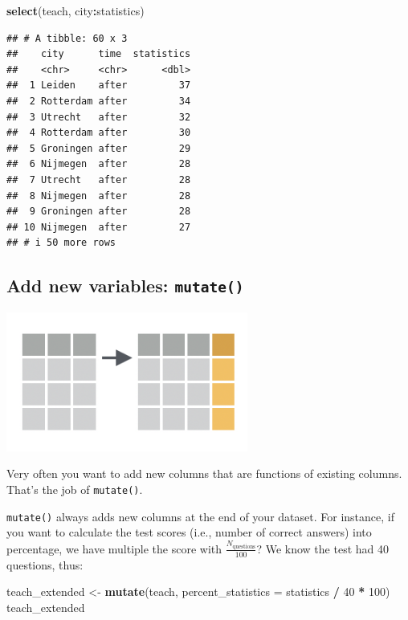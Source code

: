 \documentclass[
]{scrartcl}
\newenvironment{Shaded}{\begin{snugshade}}{\end{snugshade}}
\newcommand{\AttributeTok}[1]{\textcolor[rgb]{0.13,0.29,0.53}{#1}}
\newcommand{\DecValTok}[1]{\textcolor[rgb]{0.00,0.00,0.81}{#1}}
\newcommand{\FunctionTok}[1]{\textcolor[rgb]{0.13,0.29,0.53}{\textbf{#1}}}
\newcommand{\NormalTok}[1]{#1}
\newcommand{\OtherTok}[1]{\textcolor[rgb]{0.56,0.35,0.01}{#1}}
\newcommand{\SpecialCharTok}[1]{\textcolor[rgb]{0.81,0.36,0.00}{\textbf{#1}}}
\begin{document}
\begin{Shaded}
\begin{Highlighting}[]
\FunctionTok{select}\NormalTok{(teach, city}\SpecialCharTok{:}\NormalTok{statistics)}
\end{Highlighting}
\end{Shaded}

\begin{verbatim}
## # A tibble: 60 x 3
##    city      time  statistics
##    <chr>     <chr>      <dbl>
##  1 Leiden    after         37
##  2 Rotterdam after         34
##  3 Utrecht   after         32
##  4 Rotterdam after         30
##  5 Groningen after         29
##  6 Nijmegen  after         28
##  7 Utrecht   after         28
##  8 Nijmegen  after         28
##  9 Groningen after         28
## 10 Nijmegen  after         27
## # i 50 more rows
\end{verbatim}

\hypertarget{add-new-variables-mutate}{%
\subsection{\texorpdfstring{Add new variables: \texttt{mutate()}}{Add new variables: mutate()}}\label{add-new-variables-mutate}}

\begin{center}\includegraphics[width=300px]{images/dplyr-mutate} \end{center}

Very often you want to add new columns that are functions of existing columns. That's the job of \texttt{mutate()}.

\texttt{mutate()} always adds new columns at the end of your dataset. For instance, if you want to calculate the test scores (i.e., number of correct answers) into percentage, we have multiple the score with \(\frac{N_\text{questions}}{100}\)? We know the test had 40 questions, thus:

\begin{Shaded}
\begin{Highlighting}[]
\NormalTok{teach\_extended }\OtherTok{\textless{}{-}} \FunctionTok{mutate}\NormalTok{(teach, }\AttributeTok{percent\_statistics =}\NormalTok{ statistics }\SpecialCharTok{/} \DecValTok{40} \SpecialCharTok{*} \DecValTok{100}\NormalTok{)}
\NormalTok{teach\_extended}
\end{Highlighting}
\end{Shaded}
\end{document}
